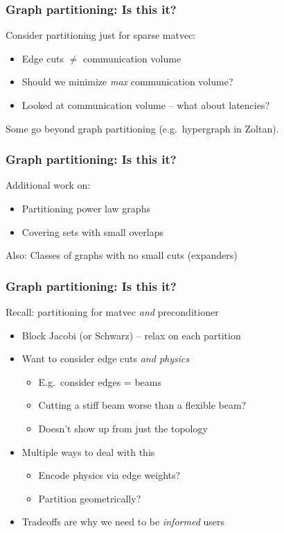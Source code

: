 \documentclass{beamer}
\begin{document}
\begin{frame}
  \frametitle{Graph partitioning: Is this it?}

  Consider partitioning just for sparse matvec:
  \begin{itemize}
  \item Edge cuts $\neq$ communication volume
  \item Should we minimize {\em max} communication volume?
  \item Looked at communication volume -- what about latencies?
  \end{itemize}
  Some go beyond graph partitioning (e.g.~hypergraph in Zoltan).
\end{frame}

\begin{frame}
  \frametitle{Graph partitioning: Is this it?}

  Additional work on:
  \begin{itemize}
  \item Partitioning power law graphs
  \item Covering sets with small overlaps
  \end{itemize}
  Also: Classes of graphs with no small cuts (expanders)

\end{frame}

\begin{frame}
  \frametitle{Graph partitioning: Is this it?}

  Recall: partitioning for matvec {\em and} preconditioner
  \begin{itemize}
  \item Block Jacobi (or Schwarz) -- relax on each partition
  \item Want to consider edge cuts {\em and physics}
    \begin{itemize}
    \item E.g.~consider edges = beams
    \item Cutting a stiff beam worse than a flexible beam?
    \item Doesn't show up from just the topology
    \end{itemize}
  \item Multiple ways to deal with this
    \begin{itemize}
    \item Encode physics via edge weights?
    \item Partition geometrically?
    \end{itemize}
  \item Tradeoffs are why we need to be {\em informed} users
  \end{itemize}
\end{frame}
\end{document}
